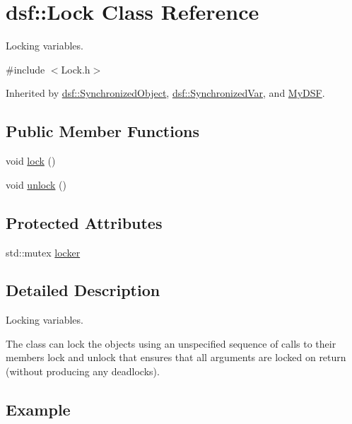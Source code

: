\hypertarget{classdsf_1_1_lock}{}\section{dsf\+:\+:Lock Class Reference}
\label{classdsf_1_1_lock}


Locking variables.  




{\ttfamily \#include $<$Lock.\+h$>$}



Inherited by \hyperlink{classdsf_1_1_synchronized_object}{dsf\+::\+Synchronized\+Object}, \hyperlink{classdsf_1_1_synchronized_var}{dsf\+::\+Synchronized\+Var}, and \hyperlink{class_my_d_s_f}{My\+D\+S\+F}.

\subsection*{Public Member Functions}
\begin{DoxyCompactItemize}
\item 
void \hyperlink{classdsf_1_1_lock_ae521388d861fe66b9c6e2f09811b0d4b}{lock} ()
\item 
void \hyperlink{classdsf_1_1_lock_a3d03f801920d458b3c3c402a0f4af323}{unlock} ()
\end{DoxyCompactItemize}
\subsection*{Protected Attributes}
\begin{DoxyCompactItemize}
\item 
std\+::mutex \hyperlink{classdsf_1_1_lock_a605f27e33e37dc8b3b920a3272461c44}{locker}
\end{DoxyCompactItemize}


\subsection{Detailed Description}
Locking variables. 

The class can lock the objects using an unspecified sequence of calls to their members lock and unlock that ensures that all arguments are locked on return (without producing any deadlocks).\hypertarget{classdsf_1_1_synchronized_object_eg}{}\subsection{Example}\label{classdsf_1_1_synchronized_object_eg}

